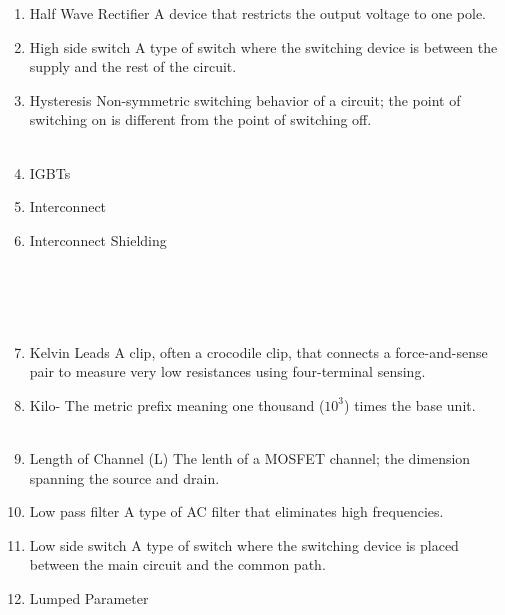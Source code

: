 \documentclass{IEEEtran}
\begin{document}
\begin{enumerate}
\\
\item Half Wave Rectifier
  \subitem A device that restricts the output voltage to one pole.\\
\item High side switch
  \subitem A type of switch where the switching device is between the supply and the rest of the circuit.\\
\item Hysteresis
  \subitem Non-symmetric switching behavior of a circuit; the point of switching on is different from the point of switching off. \\

\\
\item IGBTs
\item Interconnect
  \subitem \\
\item Interconnect Shielding
\subitem \\
\\

\\
\\

\\
\item Kelvin Leads
\subitem A clip, often a crocodile clip, that connects a force-and-sense pair to measure very low resistances using four-terminal sensing.\\ 
\item Kilo-
  \subitem The metric prefix meaning one thousand ($10^{3}$) times the base unit.\\

\\
\item Length of Channel (L)
\subitem The lenth of a MOSFET channel; the dimension spanning the source and drain. 
\item Low pass filter
  \subitem A type of AC filter that eliminates high frequencies.\\
\item Low side switch
  \subitem A type of switch where the switching device is placed between the main circuit and the common path.\\
\item Lumped Parameter
  \subitem \\ 
\\



\end{enumerate}
\end{document}

